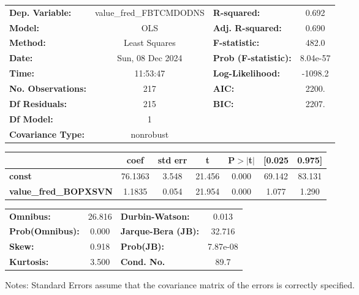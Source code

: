\begin{center}
\begin{tabular}{lclc}
\toprule
\textbf{Dep. Variable:}       & value\_fred\_FBTCMDODNS & \textbf{  R-squared:         } &     0.692   \\
\textbf{Model:}               &           OLS           & \textbf{  Adj. R-squared:    } &     0.690   \\
\textbf{Method:}              &      Least Squares      & \textbf{  F-statistic:       } &     482.0   \\
\textbf{Date:}                &     Sun, 08 Dec 2024    & \textbf{  Prob (F-statistic):} &  8.04e-57   \\
\textbf{Time:}                &         11:53:47        & \textbf{  Log-Likelihood:    } &   -1098.2   \\
\textbf{No. Observations:}    &             217         & \textbf{  AIC:               } &     2200.   \\
\textbf{Df Residuals:}        &             215         & \textbf{  BIC:               } &     2207.   \\
\textbf{Df Model:}            &               1         & \textbf{                     } &             \\
\textbf{Covariance Type:}     &        nonrobust        & \textbf{                     } &             \\
\bottomrule
\end{tabular}
\begin{tabular}{lcccccc}
                              & \textbf{coef} & \textbf{std err} & \textbf{t} & \textbf{P$> |$t$|$} & \textbf{[0.025} & \textbf{0.975]}  \\
\midrule
\textbf{const}                &      76.1363  &        3.548     &    21.456  &         0.000        &       69.142    &       83.131     \\
\textbf{value\_fred\_BOPXSVN} &       1.1835  &        0.054     &    21.954  &         0.000        &        1.077    &        1.290     \\
\bottomrule
\end{tabular}
\begin{tabular}{lclc}
\textbf{Omnibus:}       & 26.816 & \textbf{  Durbin-Watson:     } &    0.013  \\
\textbf{Prob(Omnibus):} &  0.000 & \textbf{  Jarque-Bera (JB):  } &   32.716  \\
\textbf{Skew:}          &  0.918 & \textbf{  Prob(JB):          } & 7.87e-08  \\
\textbf{Kurtosis:}      &  3.500 & \textbf{  Cond. No.          } &     89.7  \\
\bottomrule
\end{tabular}
\end{center}

Notes: \newline
 [1] Standard Errors assume that the covariance matrix of the errors is correctly specified.